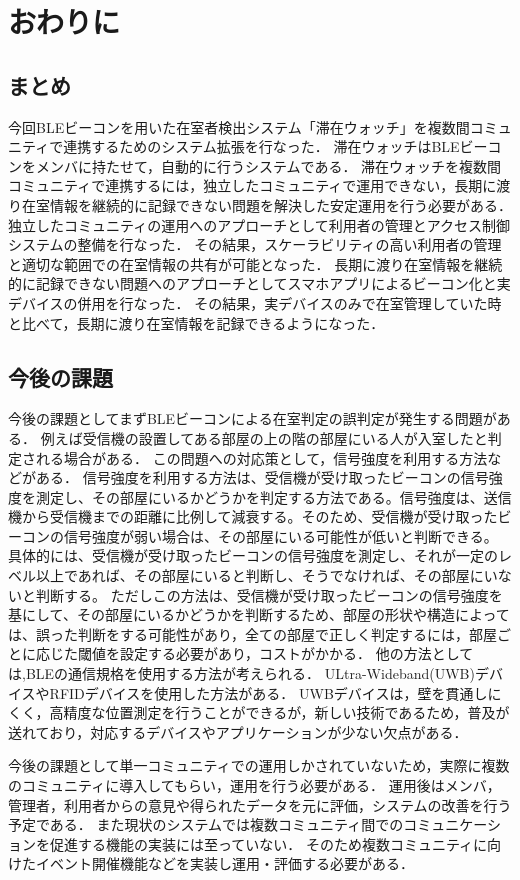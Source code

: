 \chapter{おわりに}
\thispagestyle{myheadings}

\section{まとめ}

今回BLEビーコンを用いた在室者検出システム「滞在ウォッチ」を複数間コミュニティで連携するためのシステム拡張を行なった．
滞在ウォッチはBLEビーコンをメンバに持たせて，自動的に行うシステムである．
滞在ウォッチを複数間コミュニティで連携するには，独立したコミュニティで運用できない，長期に渡り在室情報を継続的に記録できない問題を解決した安定運用を行う必要がある．
独立したコミュニティの運用へのアプローチとして利用者の管理とアクセス制御システムの整備を行なった．
その結果，スケーラビリティの高い利用者の管理と適切な範囲での在室情報の共有が可能となった．
長期に渡り在室情報を継続的に記録できない問題へのアプローチとしてスマホアプリによるビーコン化と実デバイスの併用を行なった．
その結果，実デバイスのみで在室管理していた時と比べて，長期に渡り在室情報を記録できるようになった．


\section{今後の課題}

今後の課題としてまずBLEビーコンによる在室判定の誤判定が発生する問題がある．
例えば受信機の設置してある部屋の上の階の部屋にいる人が入室したと判定される場合がある．
この問題への対応策として，信号強度を利用する方法などがある．
信号強度を利用する方法は、受信機が受け取ったビーコンの信号強度を測定し、その部屋にいるかどうかを判定する方法である。信号強度は、送信機から受信機までの距離に比例して減衰する。そのため、受信機が受け取ったビーコンの信号強度が弱い場合は、その部屋にいる可能性が低いと判断できる。
具体的には、受信機が受け取ったビーコンの信号強度を測定し、それが一定のレベル以上であれば、その部屋にいると判断し、そうでなければ、その部屋にいないと判断する。
ただしこの方法は、受信機が受け取ったビーコンの信号強度を基にして、その部屋にいるかどうかを判断するため、部屋の形状や構造によっては、誤った判断をする可能性があり，全ての部屋で正しく判定するには，部屋ごとに応じた閾値を設定する必要があり，コストがかかる．
他の方法としては,BLEの通信規格を使用する方法が考えられる．
ULtra-Wideband(UWB)デバイスやRFIDデバイスを使用した方法がある．
UWBデバイスは，壁を貫通しにくく，高精度な位置測定を行うことができるが，新しい技術であるため，普及が送れており，対応するデバイスやアプリケーションが少ない欠点がある．



今後の課題として単一コミュニティでの運用しかされていないため，実際に複数のコミュニティに導入してもらい，運用を行う必要がある．
運用後はメンバ，管理者，利用者からの意見や得られたデータを元に評価，システムの改善を行う予定である．
また現状のシステムでは複数コミュニティ間でのコミュニケーションを促進する機能の実装には至っていない．
そのため複数コミュニティに向けたイベント開催機能などを実装し運用・評価する必要がある．



